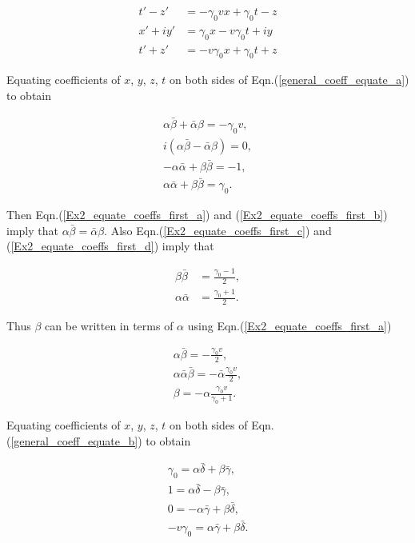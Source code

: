 \begin{align*}
t'-z' & = -\gamma_0 v x + \gamma_0 t - z \\
x'+iy' & = \gamma_0 x - v \gamma_0 t + iy  \\
t'+z' & = -v \gamma_0 x + \gamma_0 t +z
\end{align*}

\noindent Equating coefficients of $x$, $y$, $z$, $t$ on both sides of Eqn.(\ref{general_coeff_equate_a}) to obtain

\begin{subequations}
\begin{gather}\label{Ex2_equate_coeffs_first_a}
\alpha \bar{\beta} + \bar{\alpha} \beta = -\gamma_0 v, \\\label{Ex2_equate_coeffs_first_b}
i (\alpha \bar{\beta} - \bar{\alpha} \beta) = 0, \\\label{Ex2_equate_coeffs_first_c}
-\alpha \bar{\alpha} + \beta \bar{\beta} = -1, \\\label{Ex2_equate_coeffs_first_d}
\alpha \bar{\alpha} + \beta \bar{\beta} = \gamma_0. 
\end{gather}
\end{subequations}

\noindent Then Eqn.(\ref{Ex2_equate_coeffs_first_a}) and (\ref{Ex2_equate_coeffs_first_b}) imply that $\alpha \bar{\beta} = \bar{\alpha} \beta $. Also Eqn.(\ref{Ex2_equate_coeffs_first_c}) and (\ref{Ex2_equate_coeffs_first_d}) imply that

\begin{align}
\label{Ex2_refer_to_beta_beta}
\beta \bar{\beta} & = \frac{\gamma_0 - 1}{2},
\\\label{Ex2_refer_to_alpha_alpha}
\alpha \bar{\alpha} & = \frac{\gamma_0 + 1}{2}. 
\end{align}

\noindent Thus $\beta$ can be written in terms of $\alpha$ using Eqn.(\ref{Ex2_equate_coeffs_first_a})

\begin{gather*}
\alpha \bar{\beta} = -\frac{\gamma_0 v}{2}, \\
\alpha \bar{\alpha} \bar{\beta} = - \bar{\alpha} \frac{\gamma_0 v}{2}, \\
\beta = -\alpha \frac{\gamma_0 v}{\gamma_0 + 1}.
\end{gather*}

\noindent Equating coefficients of $x$, $y$, $z$, $t$ on both sides of Eqn.(\ref{general_coeff_equate_b}) to obtain

\begin{subequations}
\begin{gather}\label{Ex2_equate_coeffs_second_a}
\gamma_0 = \alpha \bar{\delta} + \beta\bar{\gamma}, \\\label{Ex2_equate_coeffs_second_b}
1 = \alpha \bar{\delta} - \beta\bar{\gamma},\\\label{Ex2_equate_coeffs_second_c}
0 = -\alpha\bar{\gamma} + \beta \bar{\delta},\\\label{Ex2_equate_coeffs_second_d}
-v\gamma_0 = \alpha\bar{\gamma} + \beta \bar{\delta}. 
\end{gather}
\end{subequations}

